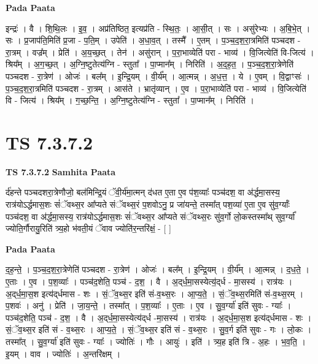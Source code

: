\documentclass[17pt]{extarticle}
\begin{document}
\textbf{Pada Paata} \newline

इन्द्रः॑ । वै । शि॒थि॒लः । इ॒व॒ । अप्र॑तिष्ठित॒ इत्यप्र॑ति - स्थि॒तः॒ । आ॒सी॒त् । सः । असु॑रेभ्यः । अ॒बि॒भे॒त् । सः । प्र॒जाप॑ति॒मिति॑ प्र॒जा - प॒ति॒म् । उपेति॑ । अ॒धा॒व॒त् । तस्मै᳚ । ए॒तम् । प॒ञ्च॒द॒श॒रा॒त्रमिति॑ पञ्चदश - रा॒त्रम् । वज्र᳚म् । प्रेति॑ । अ॒य॒च्छ॒त् । तेन॑ । असु॑रान् । प॒रा॒भाव्येति॑ परा - भाव्य॑ । वि॒जित्येति॑ वि-जित्य॑ । श्रिय᳚म् । अ॒ग॒च्छ॒त् । अ॒ग्नि॒ष्टुतेत्य॑ग्नि - स्तुता᳚ । पा॒प्मान᳚म् । निरिति॑ । अ॒द॒ह॒त॒ । प॒ञ्च॒द॒श॒रा॒त्रेणेति॑ पञ्चदश - रा॒त्रेण॑ । ओजः॑ । बल᳚म् । इ॒न्द्रि॒यम् । वी॒र्य᳚म् । आ॒त्मन्न् । अ॒ध॒त्त॒ । ये । ए॒वम् । वि॒द्वाꣳसः॑ । प॒ञ्च॒द॒श॒रा॒त्रमिति॑ पञ्चदश - रा॒त्रम् । आस॑ते । भ्रातृ॑व्यान् । ए॒व । प॒रा॒भाव्येति॑ परा - भाव्य॑ । वि॒जित्येति॑ वि - जित्य॑ । श्रिय᳚म् । ग॒च्छ॒न्ति॒ । अ॒ग्नि॒ष्टुतेत्य॑ग्नि - स्तुता᳚ । पा॒प्मान᳚म् । निरिति॑ ।  \newline




\section*{ TS 7.3.7.2 }

\textbf{TS 7.3.7.2 } \newline
\textbf{Samhita Paata} \newline

र्द॑हन्ते पञ्चदशरा॒त्रेणौजो॒ बल॑मिन्द्रि॒यं ॅवी॒र्य॑मा॒त्मन् द॑धत ए॒ता ए॒व प॑श॒व्याः᳚ पञ्च॑दश॒ वा अ॑र्द्धमा॒सस्य॒ रात्र॑योऽर्द्धमास॒शः सं॑ॅवथ्स॒र आ᳚प्यते संॅवथ्स॒रं प॒शवोऽनु॒ प्र जा॑यन्ते॒ तस्मा᳚त् पश॒व्या॑ ए॒ता ए॒व सु॑व॒र्ग्याः᳚ पञ्च॑दश॒ वा अ॑र्द्धमा॒सस्य॒ रात्र॑योऽर्द्धमास॒शः सं॑ॅवथ्स॒र आ᳚प्यते संॅवथ्स॒रः सु॑व॒र्गो लो॒कस्तस्मा᳚थ् सुव॒र्ग्या᳚ ज्योति॒र्गौरायु॒रिति॑ त्र्य॒हो भ॑वती॒यं ॅवाव ज्योति॑र॒न्तरि॑क्षं॒ - [  ] \newline

\textbf{Pada Paata} \newline

द॒ह॒न्ते॒ । प॒ञ्च॒द॒श॒रा॒त्रेणेति॑ पञ्चदश - रा॒त्रेण॑ । ओजः॑ । बल᳚म् । इ॒न्द्रि॒यम् । वी॒र्य᳚म् । आ॒त्मन्न् । द॒ध॒ते॒ । ए॒ताः । ए॒व । प॒श॒व्याः᳚ । पञ्च॑द॒शेति॒ पञ्च॑ - द॒श॒ । वै । अ॒द्‌र्ध॒मा॒सस्येत्य॒॑द्‌र्ध - मा॒सस्य॑ । रात्र॑यः । अ॒द्‌र्ध॒मा॒स॒श इत्य॑द्‌र्धमास - शः । सं॒ॅव॒थ्स॒र इति॑ सं-व॒थ्स॒रः । आ॒प्य॒ते॒ । सं॒ॅव॒थ्स॒रमिति॑ सं-व॒थ्स॒रम् । प॒शवः॑ । अनु॑ । प्रेति॑ । जा॒य॒न्ते॒ । तस्मा᳚त् । प॒श॒व्याः᳚ । ए॒ताः । ए॒व । सु॒व॒र्ग्या॑ इति॑ सुवः - ग्याः᳚ । पञ्च॑द॒शेति॒ पञ्च॑ - द॒श॒ । वै । अ॒द्‌र्ध॒मा॒सस्येत्य॑द्‌र्ध -मा॒सस्य॑ । रात्र॑यः । अ॒द्‌र्ध॒मा॒स॒श इत्य॑द्‌र्धमास - शः । सं॒ॅव॒थ्स॒र इति॑ सं - व॒थ्स॒रः । आ॒प्य॒ते॒ । सं॒ॅव॒थ्स॒र इति॑ सं - व॒थ्स॒रः । सु॒व॒र्ग इति॑ सुवः - गः । लो॒कः । तस्मा᳚त् । सु॒व॒र्ग्या॑ इति॑ सुवः - ग्याः᳚ । ज्योतिः॑ । गौः । आयुः॑ । इति॑ । त्र्य॒ह इति॑ त्रि - अ॒हः । भ॒व॒ति॒ । इ॒यम् । वाव । ज्योतिः॑ । अ॒न्तरि॑क्षम् ।  \newline
\end{document}
